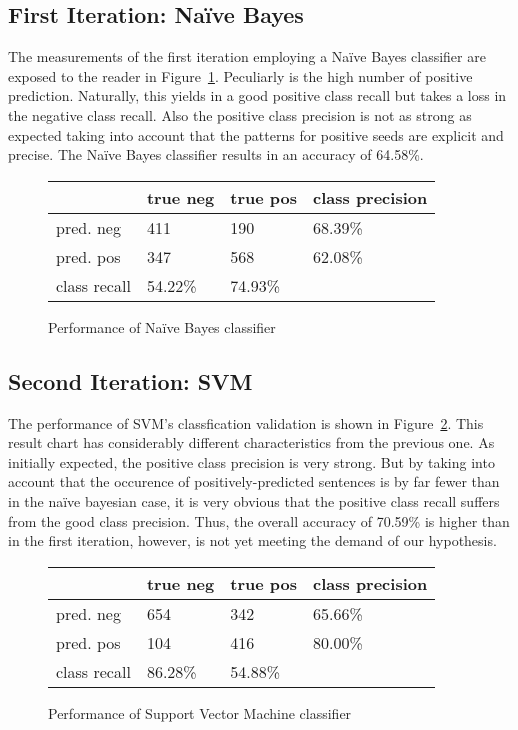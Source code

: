 \documentclass[11pt,titlepage,oneside,openany]{book}
\begin{document}
\subsection{First Iteration: Na\"{i}ve Bayes}
\label{sec:nb}

The measurements of the first iteration employing a Na\"{i}ve Bayes classifier are exposed to the reader in Figure~\ref{fig.nb}. Peculiarly is the high number of positive prediction. Naturally, this yields in a good positive class recall but takes a loss in the negative class recall. Also the positive class precision is not as strong as expected taking into account that the patterns for positive seeds are explicit and precise. The Na\"{i}ve Bayes classifier results in an accuracy of 64.58\%.

\begin{figure} [h!]
\centering
\begin{tabular}{ | l | l | l | l | }
\hline
	 & true neg & true pos & class precision \\ \hline
	pred. neg & 411 & 190 & 68.39\% \\ \hline
	pred. pos & 347 & 568 & 62.08\% \\ \hline
	class recall & 54.22\% & 74.93\% &  \\ \hline
\end{tabular}
\caption{Performance of Na\"{i}ve Bayes classifier}
\label{fig.nb}
\end{figure}


\subsection{Second Iteration: SVM}
\label{sec:svm}

The performance of SVM's classfication validation is shown in Figure~\ref{fig.svm}. This result chart has considerably different characteristics from the previous one. As initially expected, the positive class precision is very strong. But by taking into account that the occurence of positively-predicted sentences is by far fewer than in the na\"{i}ve bayesian case, it is very obvious that the positive class recall suffers from the good class precision. Thus, the overall accuracy of 70.59\% is higher than in the first iteration, however, is not yet meeting the demand of our hypothesis.

\begin{figure} [h!]
\centering
\begin{tabular}{ | l | l | l | l | }
\hline
	 & true neg & true pos & class precision \\ \hline
	pred. neg & 654 & 342 & 65.66\% \\ \hline
	pred. pos & 104 & 416 & 80.00\% \\ \hline
	class recall & 86.28\% & 54.88\% &  \\ \hline
\end{tabular}
\caption{Performance of Support Vector Machine classifier}
\label{fig.svm}
\end{figure}
\end{document}
